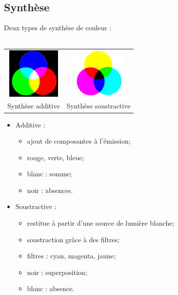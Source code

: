\documentclass[14pt]{beamer}
\begin{document}
\subsection{Synthèse}
\begin{frame}{\subsecname}
Deux types de synthèse de couleur :\\~\\

    \begin{table}[h]
        \centering
        \begin{tabular}{cc}
            \includegraphics[width=100px]{synthese_additive}
            &
            \includegraphics[width=100px]{synthese_soustractive}\\
            Synthèse additive & Synthèse soustractive\\
        \end{tabular}
    \end{table}
\end{frame}


\begin{frame}{\subsecname}
\begin{itemize}
    \item Additive :
        \begin{itemize}
        \item ajout de composantes à l'émission;
        \item rouge, verte, bleue;
        \item blanc : somme;
        \item noir : absences.
        \end{itemize}
    \item Soustractive :
        \begin{itemize}
        \item restitue à partir d'une source de lumière blanche;
        \item soustraction grâce à des filtres;
        \item filtres : cyan, magenta, jaune;
        \item noir : superposition;
        \item blanc : absence.
        \end{itemize}
\end{itemize}
\end{frame}
\end{document}
